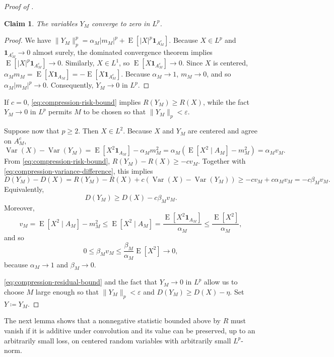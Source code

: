 \documentclass[11pt]{amsart}
\theoremstyle{plain}
\newtheorem{claim}{Claim}
\theoremstyle{definition}
\theoremstyle{remark}
\numberwithin{equation}{section}
\newcommand{\1}{\mathbf 1}
\begin{document}
\begin{proof}[Proof of ]
\begin{claim}
    The variables \(Y_M\) converge to zero in \(L^p\).
\end{claim}
\begin{proof}
We have \(\lVert Y_M\rVert_p^p
=
\alpha_M|m_M|^p
+
\operatorname{E}\left[|X|^p\mathbf 1_{A_M^c}\right]\). Because \(X\in L^p\) and \(\mathbf 1_{A_M^c}\to0\) almost surely, the dominated convergence theorem implies
\(\operatorname{E}\left[|X|^p\mathbf 1_{A_M^c}\right] \rightarrow 0\).
Similarly, \(X\in L^1\), so
\(\operatorname{E}\left[X\mathbf 1_{A_M^c}\right]\rightarrow0\). Since \(X\) is centered,
\(\alpha_Mm_M
=
\operatorname{E}\left[X\mathbf 1_{A_M}\right]
=
-\operatorname{E}\left[X\mathbf 1_{A_M^c}\right]\). Because \(\alpha_M\to1\), \(m_M\to0\), and so
\(\alpha_M|m_M|^p\to0\). Consequently,
\(Y_M \rightarrow 0\) in \(L^p\).
\end{proof}


If \(c=0\), \eqref{eq:compression-risk-bound} implies \(R(Y_M)\geq R(X)\), while the fact \(Y_M \rightarrow 0\) in \(L^p\) permits \(M\) to be chosen so that \(\lVert Y_M\rVert_p<\varepsilon\).


Suppose now that \(p\geq2\). Then \(X\in L^2\). Because \(X\) and \(Y_M\) are centered and agree on \(A_M^c\),
\[\operatorname{Var}(X)-\operatorname{Var}(Y_M) =
\operatorname{E}[X^2\mathbf 1_{A_M}]
-\alpha_Mm_M^2 = \alpha_M\left(
\operatorname{E}[X^2\mid A_M]-m_M^2
\right) = \alpha_Mv_M.
\tag{3}\label{eq:compression-variance-difference}
\]
From \eqref{eq:compression-risk-bound}, \(R(Y_M)-R(X)\geq-cv_M\). Together with
\eqref{eq:compression-variance-difference}, this implies
\[D(Y_M)-D(X) =
R(Y_M)-R(X)
+c\left(\operatorname{Var}(X)-\operatorname{Var}(Y_M)\right) \geq -cv_M+c\alpha_Mv_M = -c\beta_Mv_M.
\]
Equivalently,
\[
D(Y_M)\geq D(X)-c\beta_Mv_M.
\tag{4}\label{eq:compression-residual-bound}
\]
Moreover,
\[
v_M
=
\operatorname{E}[X^2\mid A_M]-m_M^2
\leq
\operatorname{E}[X^2\mid A_M]
=
\frac{\operatorname{E}[X^2\mathbf 1_{A_M}]}{\alpha_M}
\leq
\frac{\operatorname{E}[X^2]}{\alpha_M},
\]
and so
\[
0\leq\beta_Mv_M
\leq
\frac{\beta_M}{\alpha_M}\operatorname{E}[X^2]
\longrightarrow0,
\]
because \(\alpha_M\to1\) and \(\beta_M\to0\).

\eqref{eq:compression-residual-bound} and the fact that \(Y_M \rightarrow 0\) in \(L^p\) allow us to choose \(M\) large enough so that \(\lVert Y_M\rVert_p<\varepsilon\) and \(D(Y_M)\geq D(X)-\eta\). Set \(Y\coloneqq Y_M\).
\end{proof}

The next lemma shows that a nonnegative statistic bounded above by \(R\) must vanish if it is additive under convolution and its value can be preserved, up to an arbitrarily small loss, on centered random variables with arbitrarily small \(L^p\)-norm.
\end{document}

